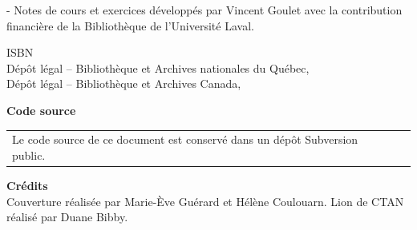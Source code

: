\begin{adjustwidth*}{\unitlength}{-\unitlength}
  Notes de cours et exercices développés par Vincent Goulet avec la
  contribution financière de la Bibliothèque de l'Université Laval.
  \vfill

  ISBN {\ISBN} \\
  Dépôt légal -- Bibliothèque et Archives nationales du Québec, {\year} \\
  Dépôt légal -- Bibliothèque et Archives Canada, {\year}
  \vfill

  \textbf{Code source} \\[4pt]
  \begin{tabularx}{1.0\linewidth}{@{}Xl@{}}
    Le code source de ce document est conservé dans un dépôt
    Subversion public. &
                         \raisebox{-7pt}{%
                         \href{https://svn.fsg.ulaval.ca/svn-pub/vgoulet/formation_latex/}{%
                         \browsebutton}}
  \end{tabularx}
  \vfill

  \textbf{Crédits} \\
  Couverture réalisée par Marie-Ève Guérard et Hélène Coulouarn.
  Lion de CTAN réalisé par Duane Bibby.
\end{adjustwidth*}
\endgroup

